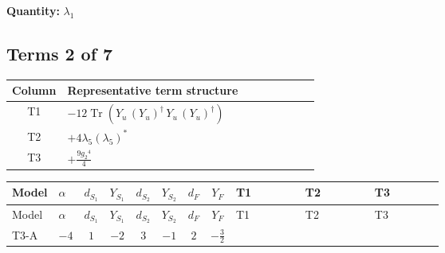\documentclass[8pt]{article}
\begin{document}
\begin{landscape}
\begin{longtable}{@{}llcccccc >{\raggedright\arraybackslash}p{0.21\linewidth} >{\raggedright\arraybackslash}p{0.21\linewidth} >{\raggedright\arraybackslash}p{0.21\linewidth}@{}}
\midrule
\bottomrule
\end{longtable}
\clearpage
\noindent\textbf{Quantity: }$\lambda_1$\par\smallskip
\subsection*{Terms 2 of 7}
\begin{center}
\begin{tabular}{@{}c >{\raggedright\arraybackslash}p{0.82\linewidth}@{}}
\toprule
Column & Representative term structure \\
\midrule
T1 & \(\displaystyle -12 \operatorname{Tr}\!\left({Y_u}\,\left({Y_u}\right)^{\dagger}\,{Y_u}\,\left({Y_u}\right)^{\dagger}\right)\) \\
\midrule
T2 & \(\displaystyle +4 {\lambda_5} \left({\lambda_5}\right)^{*}\) \\
\midrule
T3 & \(\displaystyle +\frac{9 {g_2}^4}{4}\) \\
\midrule
\bottomrule
\end{tabular}
\end{center}
\smallskip
\tiny
\begin{longtable}{@{}llcccccc >{\raggedright\arraybackslash}p{0.21\linewidth} >{\raggedright\arraybackslash}p{0.21\linewidth} >{\raggedright\arraybackslash}p{0.21\linewidth}@{}}
\toprule
Model & $\alpha$ & $d_{S_1}$ & $Y_{S_1}$ & $d_{S_2}$ & $Y_{S_2}$ & $d_F$ & $Y_F$ & T1 & T2 & T3 \\
\midrule
\endfirsthead
\toprule
Model & $\alpha$ & $d_{S_1}$ & $Y_{S_1}$ & $d_{S_2}$ & $Y_{S_2}$ & $d_F$ & $Y_F$ & T1 & T2 & T3 \\
\midrule
\endhead
T3-A & $-4$ & $1$ & $-2$ & $3$ & $-1$ & $2$ & $-\frac{3}{2}$ & \scriptsize\adjustbox{max width=\linewidth}{$\begin{gathered} -12 \operatorname{Tr}\!\left({Y_u}\,\left({Y_u}\right)^{\dagger}\,{Y_u}\,\left({Y_u}\right)^{\dagger}\right)\end{gathered}$} & \scriptsize\adjustbox{max width=\linewidth}{$\begin{gathered} +4 {\lambda_5} \left({\lambda_5}\right)^{*}\end{gathered}$} & \scriptsize\adjustbox{max width=\linewidth}{$\begin{gathered} +\frac{9 {g_2}^4}{4}\end{gathered}$} \\
\midrule

\end{longtable}
\end{landscape}
\end{document}
